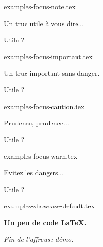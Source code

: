 \begin{filecontents*}[overwrite]{examples-focus-note.tex}
\begin{tdocnote}
    Un truc utile à vous dire...
\end{tdocnote}

\begin{tdocnote}
    Utile ?
\end{tdocnote}
\end{filecontents*}


\begin{filecontents*}[overwrite]{examples-focus-important.tex}
\begin{tdocimportant}
    Un truc important sans danger.
\end{tdocimportant}

\begin{tdocimportant}
    Utile ?
\end{tdocimportant}
\end{filecontents*}


\begin{filecontents*}[overwrite]{examples-focus-caution.tex}
\begin{tdoccaution}
    Prudence, prudence...
\end{tdoccaution}

\begin{tdoccaution}
    Utile ?
\end{tdoccaution}
\end{filecontents*}


\begin{filecontents*}[overwrite]{examples-focus-warn.tex}
\begin{tdocwarn}
    Evitez les dangers...
\end{tdocwarn}

\begin{tdocwarn}
    Utile ?
\end{tdocwarn}
\end{filecontents*}


\begin{filecontents*}[overwrite]{examples-showcase-default.tex}
\begin{tdocshowcase}
    \bfseries Un peu de code \LaTeX.

    \bigskip

    \emph{\large Fin de l'affreuse démo.}
\end{tdocshowcase}
\end{filecontents*}


